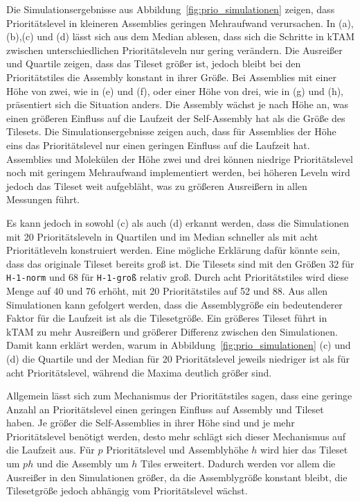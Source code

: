 Die Simulationsergebnisse aus Abbildung~\ref{fig:prio_simulationen} zeigen, dass Prioritätslevel in kleineren Assemblies geringen Mehraufwand verursachen. In (a),(b),(c) und (d) lässt sich aus dem Median ablesen, dass sich die Schritte in kTAM zwischen unterschiedlichen Prioritätsleveln nur gering verändern. Die Ausreißer und Quartile zeigen, dass das Tileset größer ist, jedoch bleibt bei den Prioritätstiles die Assembly konstant in ihrer Größe. Bei Assemblies mit einer Höhe von zwei, wie in (e) und (f), oder einer Höhe von drei, wie in (g) und (h), präsentiert sich die Situation anders. Die Assembly wächst je nach Höhe an, was einen größeren Einfluss auf die Laufzeit der Self-Assembly hat als die Größe des Tilesets. Die Simulationsergebnisse zeigen auch, dass für Assemblies der Höhe eins das Prioritätslevel nur einen geringen Einfluss auf die Laufzeit hat. Assemblies und Molekülen der Höhe zwei und drei können niedrige Prioritätslevel noch mit geringem Mehraufwand implementiert werden, bei höheren Leveln wird jedoch das Tileset weit aufgebläht, was zu größeren Ausreißern in allen Messungen führt. 

Es kann jedoch in sowohl (c) als auch (d) erkannt werden, dass die Simulationen mit 20 Prioritätsleveln in Quartilen und im Median schneller als mit acht Prioritätleveln konstruiert werden. Eine mögliche Erklärung dafür könnte sein, dass das originale Tileset bereits groß ist. Die Tilesets sind mit den Größen 32 für \texttt{H-1-norm} und 68 für \texttt{H-1-groß} relativ groß. Durch acht Prioritätstiles wird diese Menge auf 40 und 76 erhöht, mit 20 Prioritätstiles auf 52 und 88. Aus allen Simulationen kann gefolgert werden, dass die Assemblygröße ein bedeutenderer Faktor für die Laufzeit ist als die Tilesetgröße. Ein größeres Tileset führt in kTAM zu mehr Ausreißern und größerer Differenz zwischen den Simulationen. Damit kann erklärt werden, warum in Abbildung~\ref{fig:prio_simulationen} (c) und (d) die Quartile und der Median für 20 Prioritätslevel jeweils niedriger ist als für acht Prioritätslevel, während die Maxima deutlich größer sind. 

Allgemein lässt sich zum Mechanismus der Prioritätstiles sagen, dass eine geringe Anzahl an Prioritätslevel einen geringen Einfluss auf Assembly und Tileset haben. Je größer die Self-Assemblies in ihrer Höhe sind und je mehr Prioritätslevel benötigt werden, desto mehr schlägt sich dieser Mechanismus auf die Laufzeit aus. Für $p$ Prioritätslevel und Assemblyhöhe $h$ wird hier das Tileset um $ph$ und die Assembly um $h$ Tiles erweitert. Dadurch werden vor allem die Ausreißer in den Simulationen größer, da die Assemblygröße konstant bleibt, die Tilesetgröße jedoch abhängig vom Prioritätslevel wächst.

